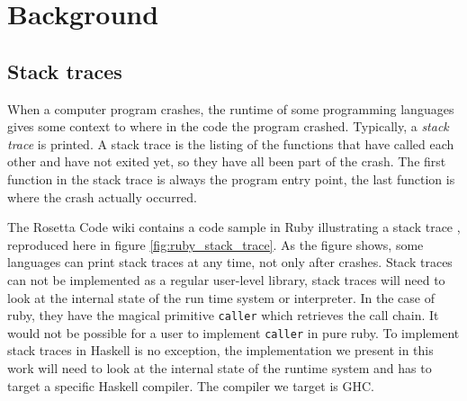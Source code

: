 \chapter{Background}


\section{Stack traces}

When a computer program crashes, the runtime of some programming languages
gives some context to where in the code the program crashed.
Typically, a \emph{stack trace} is printed. A stack trace is the listing
of the functions that have called each other and have not exited yet, so
they have all been part of the crash. The first function in the stack
trace is always the program entry point, the last function is where the
crash actually occurred.

The Rosetta Code wiki contains a code sample in Ruby illustrating a stack
trace \cite{rosetta_stone_st}, reproduced here in figure
\ref{fig:ruby_stack_trace}. As the figure shows, some languages can print stack
traces at any time, not only after crashes. Stack traces can not be
implemented as a regular user-level library, stack traces will need
to look at the internal state of the run time system or interpreter.
In the case of ruby, they have the magical primitive \texttt{caller} which
retrieves the call chain. It would not be possible for a user
to implement \texttt{caller} in pure ruby. To implement stack traces
in Haskell is no exception, the implementation we present in this work
will need to look at the internal state of the runtime system and has to
target a specific Haskell compiler. The compiler we target is GHC.

